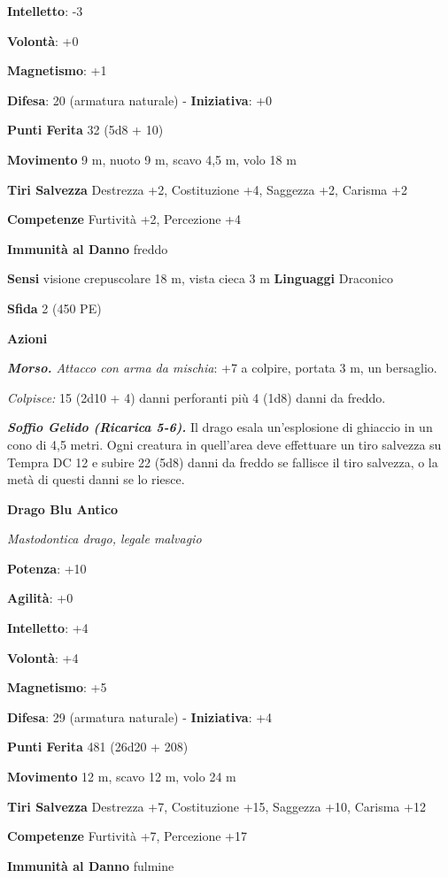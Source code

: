\begin{multicols}{2}
\textbf{Intelletto}: -3

\textbf{Volontà}: +0

\textbf{Magnetismo}: +1

\textbf{Difesa}: 20 (armatura naturale) - \textbf{Iniziativa}: +0

\textbf{Punti Ferita} 32 (5d8 + 10)

\textbf{Movimento} 9 m, nuoto 9 m, scavo 4,5 m, volo 18 m

\textbf{Tiri Salvezza} Destrezza +2, Costituzione +4, Saggezza +2,
Carisma +2

\textbf{Competenze} Furtività +2, Percezione +4

\textbf{Immunità al Danno} freddo

\textbf{Sensi} visione crepuscolare 18 m, vista cieca 3 m
\textbf{Linguaggi} Draconico

\textbf{Sfida} 2 (450 PE)

\textbf{Azioni}

\emph{\textbf{Morso.} Attacco con arma da mischia}: +7 a colpire,
portata 3 m, un bersaglio.

\emph{Colpisce:} 15 (2d10 + 4) danni perforanti più 4 (1d8) danni da
freddo.

\emph{\textbf{Soffio Gelido (Ricarica 5-6).}} Il drago esala
un'esplosione di ghiaccio in un cono di 4,5 metri. Ogni creatura in
quell'area deve effettuare un tiro salvezza su Tempra DC 12 e
subire 22 (5d8) danni da freddo se fallisce il tiro salvezza, o la metà
di questi danni se lo riesce.



\textbf{Drago Blu Antico}

\emph{Mastodontica drago, legale malvagio}

\textbf{Potenza}: +10

\textbf{Agilità}: +0

\textbf{Intelletto}: +4

\textbf{Volontà}: +4

\textbf{Magnetismo}: +5

\textbf{Difesa}: 29 (armatura naturale) - \textbf{Iniziativa}: +4

\textbf{Punti Ferita} 481 (26d20 + 208)

\textbf{Movimento} 12 m, scavo 12 m, volo 24 m

\textbf{Tiri Salvezza} Destrezza +7, Costituzione +15, Saggezza +10,
Carisma +12

\textbf{Competenze} Furtività +7, Percezione +17

\textbf{Immunità al Danno} fulmine


\end{multicols}
